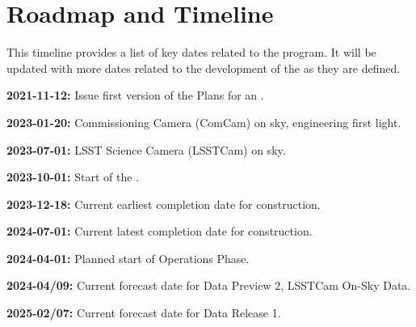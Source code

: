 \section{Roadmap and Timeline} \label{sec:timeline}


This timeline provides a list of key dates  related to the \es program.
It will be updated with more dates related to the development of the \esp as they are defined.

\textbf{2021-11-12:} Issue first version of the \ro Plans for an \esp.

\textbf{2023-01-20:} Commissioning Camera (ComCam) on sky, engineering first light.

\textbf{2023-07-01:} LSST Science Camera (LSSTCam) on sky.

\textbf{2023-10-01:} Start of the \svs.

\textbf{2023-12-18:} Current earliest completion date for construction.

\textbf{2024-07-01:} Current latest completion date for construction.

\textbf{2024-04-01:} Planned start of Operations Phase.

\textbf{2024-04/09:} Current forecast date for Data Preview 2, LSSTCam On-Sky Data.

\textbf{2025-02/07:} Current forecast date for Data Release 1.
